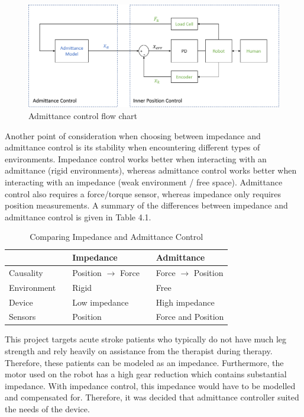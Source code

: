 \documentclass[12pt]{report}
\begin{document}
		\begin{figure}[h] 
		\centering
		\includegraphics[width=\linewidth]{admittance_diagram}
		\caption{Admittance control flow chart}
		\label{fig:adm_diagram}
	\end{figure}
	
	Another point of consideration when choosing between impedance and admittance control is its stability when encountering different types of environments. Impedance control works better when interacting with an admittance (rigid environments), whereas admittance control works better when interacting with an impedance (weak environment / free space). Admittance control also requires a force/torque sensor, whereas impedance only requires position measurements. A summary of the differences between impedance and admittance control is given in Table 4.1.
	
		\begin{table}[h] \label{tab:imp_vs_adm}
	\centering \doublespacing
	\caption{Comparing Impedance and Admittance Control}
	\begin{tabular}{l l l l l}
	\toprule
	& & Impedance & & Admittance \\
	\midrule
	\rowcolor{gray!10} Causality & & Position $\rightarrow$ Force &  & Force $\rightarrow$ Position \\
	Environment & & Rigid & & Free \\
	\rowcolor{gray!10} Device & & Low impedance & & High impedance \\
	Sensors & & Position & & Force and Position \\
	\bottomrule
	\end{tabular}
	\end{table}
	
	This project targets acute stroke patients who typically do not have much leg strength and rely heavily on assistance from the therapist during therapy. Therefore, these patients can be modeled as an impedance. Furthermore, the motor used on the robot has a high gear reduction which contains substantial impedance. With impedance control, this impedance would have to be modelled and compensated for. Therefore, it was decided that admittance controller suited the needs of the device. 
	
\end{document}
